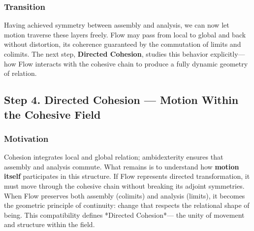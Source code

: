 \documentclass[11pt]{article}
\begin{document}
\subsubsection*{Transition}
\label{sec:orgc038d38}
Having achieved symmetry between assembly and analysis,  
we can now let motion traverse these layers freely.  
Flow may pass from local to global and back without distortion,  
its coherence guaranteed by the commutation of limits and colimits.  
The next step, \textbf{Directed Cohesion}, studies this behavior explicitly—  
how Flow interacts with the cohesive chain to produce  
a fully dynamic geometry of relation.
\subsection*{Step 4. Directed Cohesion — Motion Within the Cohesive Field}
\label{sec:org40bc496}

\subsubsection*{Motivation}
\label{sec:org1103ea7}
Cohesion integrates local and global relation; ambidexterity ensures that assembly and analysis commute.  
What remains is to understand how \textbf{motion itself} participates in this structure.  
If Flow represents directed transformation, it must move through the cohesive chain without breaking its adjoint symmetries.  
When Flow preserves both assembly (colimits) and analysis (limits),  
it becomes the geometric principle of continuity:  
change that respects the relational shape of being.  
This compatibility defines *Directed Cohesion*—  
the unity of movement and structure within the field.
\end{document}

